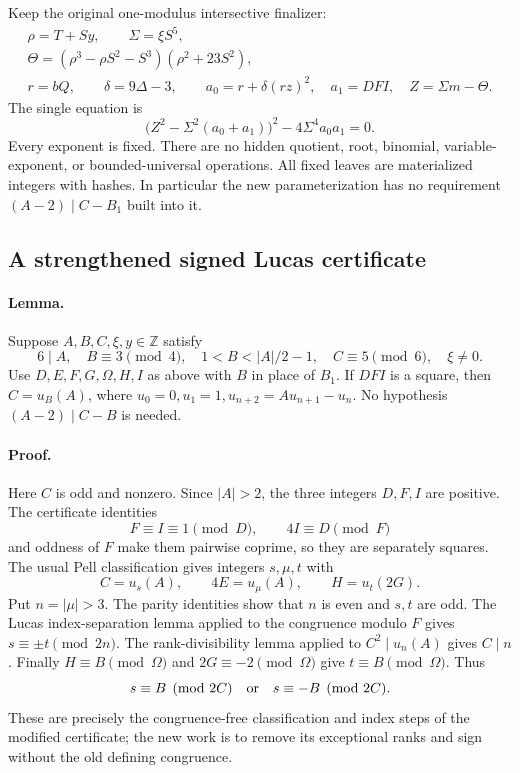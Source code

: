 Keep the original one-modulus intersective finalizer:
\begin{gather*}
 \rho=T+Sy,\qquad \Sigma=\xi S^5,\\
 \Theta=(\rho^3-\rho S^2-S^3)(\rho^2+23S^2),\\
 r=bQ,\qquad \delta=9\Delta-3,\qquad
 a_0=r+\delta(rz)^2,\quad a_1=DFI,\quad Z=\Sigma m-\Theta.
\end{gather*}
The single equation is
\begin{equation}\label{eq:free-C-final}
 \boxed{\bigl(Z^2-\Sigma^2(a_0+a_1)\bigr)^2
             -4\Sigma^4a_0a_1=0.}
\end{equation}
Every exponent is fixed. There are no hidden quotient, root, binomial,
variable-exponent, or bounded-universal operations. All fixed leaves are
materialized integers with hashes. In particular the new parameterization
has no requirement $(A-2)\mid C-B_1$ built into it.

\subsection{A strengthened signed Lucas certificate}

\paragraph{Lemma.}
Suppose $A,B,C,\xi,y\in\mathbb Z$ satisfy
\[
 6\mid A,\quad B\equiv3\pmod4,\quad
 1<B<|A|/2-1,\quad C\equiv5\pmod6,\quad\xi\ne0.
\]
Use $D,E,F,G,\Omega,H,I$ as above with $B$ in place of $B_1$.
If $DFI$ is a square, then $C=u_B(A)$, where
$u_0=0,u_1=1,u_{n+2}=Au_{n+1}-u_n$.
No hypothesis $(A-2)\mid C-B$ is needed.

\paragraph{Proof.}
Here $C$ is odd and nonzero. Since $|A|>2$, the three integers $D,F,I$
are positive. The certificate identities
\[
 F\equiv I\equiv1\pmod D,\qquad 4I\equiv D\pmod F
\]
and oddness of $F$ make them pairwise coprime, so they are separately
squares. The usual Pell classification gives integers $s,\mu,t$ with
\[
 C=u_s(A),\qquad 4E=u_\mu(A),\qquad H=u_t(2G).
\]
Put $n=|\mu|>3$. The parity identities show that $n$ is even and $s,t$
are odd. The Lucas index-separation lemma applied to the congruence modulo
$F$ gives $s\equiv\pm t\pmod{2n}$. The rank-divisibility lemma applied
to $C^2\mid u_n(A)$ gives $C\mid n$. Finally $H\equiv B\pmod\Omega$
and $2G\equiv-2\pmod\Omega$ give $t\equiv B\pmod\Omega$.
Thus
\begin{equation}\label{eq:free-C-rank-residue}
 s\equiv B\pmod{2C}\quad\hbox{or}\quad s\equiv-B\pmod{2C}.
\end{equation}
These are precisely the congruence-free classification and index steps of
the modified certificate; the new work is to remove its exceptional ranks
and sign without the old defining congruence.

